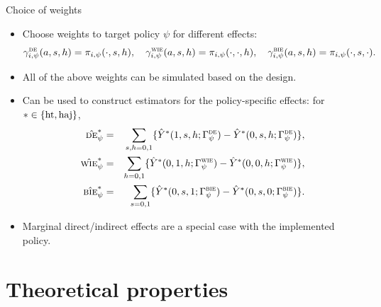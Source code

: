 \documentclass[aspectratio=169]{beamer}
\newcommand{\de}{\textsc{de}}
\newcommand{\bie}{\textsc{bie}}
\newcommand{\wie}{\textsc{wie}}
\newcommand{\horthom}{\textup{ht}}
\newcommand{\haj}{\textup{haj}}
\begin{document}
\begin{frame}{Choice of weights}
\begin{itemize}
\pause 
    \item Choose weights to target policy \(\psi\) for different effects: 
    {\small 
  \[
    \gamma^{\de}_{i,\psi}(a,s,h)=\pi_{i,\psi}(\cdot,s,h),\quad
    \gamma^{\wie}_{i,\psi}(a,s,h)=\pi_{i,\psi}(\cdot,\cdot,h),\quad
    \gamma^{\bie}_{i,\psi}(a,s,h)=\pi_{i,\psi}(\cdot,s,\cdot).
  \]}\pause 
   \item All of the above weights can be simulated based on the design.
\pause   

  \item Can be used to construct estimators for the policy-specific effects: for \(*\in\{\horthom,\haj\}\),
  {\small 
  \begin{eqnarray*}
    \hat{\de}_{\psi}^{*} &=& \sum_{s,h=0,1} \{\hat{Y}^{*}(1,s,h;\Gamma_{\psi}^{\de})  - \hat{Y}^{*}(0,s,h;\Gamma_{\psi}^{\de})\}, \\
    \hat{\wie}_{\psi}^{*} &=& \sum_{h=0,1} \{\hat{Y}^{*}(0,1,h;\Gamma_{\psi}^{\wie}) - \hat{Y}^{*}(0,0,h;\Gamma_{\psi}^{\wie})\}, \\
    \hat{\bie}_{\psi}^{*} &=& \sum_{s=0,1} \{\hat{Y}^{*}(0,s,1;\Gamma_{\psi}^{\bie}) - \hat{Y}^{*}(0,s,0;\Gamma_{\psi}^{\bie})\}.
\end{eqnarray*}
} 
\pause 

    \item Marginal direct/indirect effects are a special case with the implemented policy. 
\end{itemize}
    
\end{frame}


\section{Theoretical properties}
\end{document}
